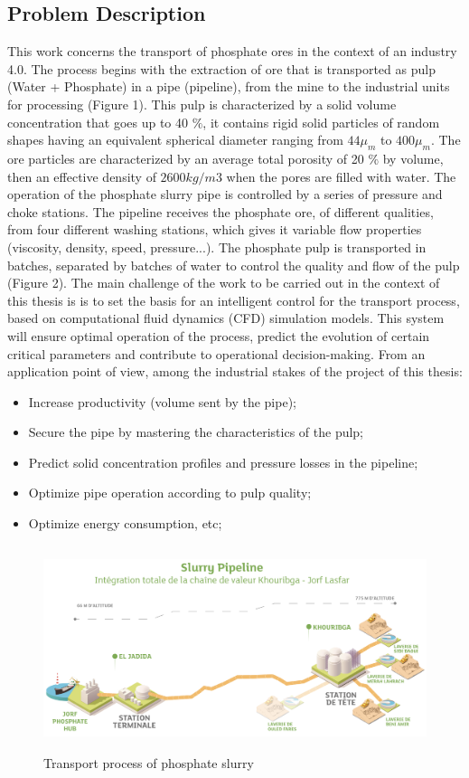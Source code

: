 \documentclass[review,3p,times,12pt]{elsarticle}
\begin{document}
\subsection{Problem Description }
This work concerns the transport of phosphate ores in the context of an industry 4.0. The process begins with the extraction of ore that is transported as pulp (Water + Phosphate) in a pipe (pipeline), from the mine to the industrial units for processing (Figure 1). This pulp is characterized by a solid volume concentration that goes up  to 40 $\%$, it contains rigid solid particles of random shapes having an equivalent spherical diameter ranging from $44 \mu_m$ to $400 \mu_m$. The ore particles are characterized by an average total porosity of 20 $\%$ by volume, then an effective density of $2600 kg/m3$ when the pores are filled with water. The operation of the phosphate slurry pipe is controlled by a series of pressure and choke stations. The pipeline receives the phosphate ore, of different qualities, from four different washing stations, which gives it variable flow properties (viscosity, density, speed, pressure...). The phosphate pulp is transported in batches, separated by batches of water to control the quality and flow of the pulp (Figure 2). The main challenge of the work to be carried out in the context of this thesis is is to set the basis for an intelligent control for the transport process, based on computational fluid dynamics (CFD) simulation models. This system will ensure optimal operation of the process, predict the evolution of certain critical parameters and contribute to operational decision-making. From an application point of view, among the industrial stakes of the project of this thesis:
\begin{itemize}
\item Increase productivity (volume sent by the pipe);
\item Secure the pipe by mastering the characteristics of the pulp;
\item Predict solid concentration profiles and pressure losses in the pipeline;
\item Optimize pipe operation according to pulp quality;
\item Optimize energy consumption, etc;
\end{itemize}

\begin{figure}[h!]
\begin{center}
%
\includegraphics[trim=0cm 0cm 0cm 0cm,clip,width=12cm,height=6cm]{figs/pipe.png}
\caption{Transport process of phosphate slurry }
\label{fig:gauss}
\end{center}
\end{figure} 
\end{document}
